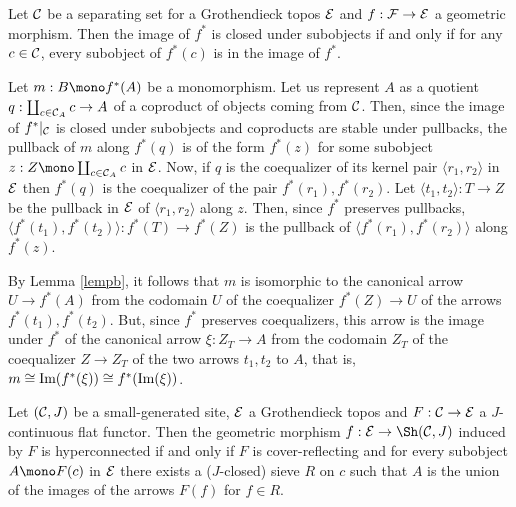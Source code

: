 \documentclass[a4paper,12pt]{article}
\begin{document}
\begin{proposition}\label{prophypersubobjects}
	Let ${\cal C}$ be a separating set for a Grothendieck topos $\cal E$ and $f:{\cal F}\to {\cal E}$ a geometric morphism. Then the image of $f^{\ast}$ is closed under subobjects if and only if for any $c\in {\cal C}$, every subobject of $f^{\ast}(c)$ is in the image of $f^{\ast}$.
\end{proposition}

\begin{proofs}
	Let $m:B\mono f^{\ast}(A)$ be a monomorphism. Let us represent $A$ as a quotient $q:\coprod_{c\in {\cal C}_{A}}c\to A$ of a coproduct of objects coming from $\cal C$. Then, since the image of $f^{\ast}|_{\cal C}$ is closed under subobjects and coproducts are stable under pullbacks, the pullback of $m$ along $f^{\ast}(q)$ is of the form $f^{\ast}(z)$ for some subobject $z:Z\mono \coprod_{c\in {\cal C}_{A}}c$ in $\cal E$. Now, if $q$ is the coequalizer of its kernel pair $\langle r_{1},r_{2} \rangle  $ in $\cal E$ then $f^{\ast}(q)$ is the coequalizer of the pair $f^{\ast}(r_{1}), f^{\ast}(r_{2})$. Let $\langle t_{1}, t_{2}\rangle:T\to Z$ be the pullback in $\cal E$ of $\langle r_{1}, r_{2}\rangle  $ along $z$. Then, since $f^{\ast}$ preserves pullbacks, $\langle f^{\ast}(t_{1}), f^{\ast}(t_{2})\rangle:f^{\ast}(T)\to f^{\ast}(Z)$ is the pullback of $\langle f^{\ast}(r_{1}), f^{\ast}(r_{2})\rangle  $ along $f^{\ast}(z)$.  
	
	 By Lemma \ref{lempb}, it follows that $m$ is isomorphic to the canonical arrow $U \to f^{\ast}(A)$ from the codomain $U$ of the coequalizer $f^{\ast}(Z)\to U$ of the arrows $f^{\ast}(t_{1}), f^{\ast}(t_{2})$. But, since $f^{\ast}$ preserves coequalizers, this arrow is the image under $f^{\ast}$ of the canonical arrow $\xi:Z_{T} \to A$ from the codomain $Z_{T}$ of the coequalizer $Z\to Z_{T}$ of the two arrows $t_{1}, t_{2}$ to $A$, that is, $m\cong \textup{Im}(f^{\ast}(\xi))\cong f^{\ast}(\textup{Im}(\xi))$. 
\end{proofs}

\begin{proposition}\label{prophyperconnected}
	Let $({\cal C}, J)$ be a small-generated site, $\cal E$ a Grothendieck topos and $F:{\cal C}\to {\cal E}$ a $J$-continuous flat  functor. Then the geometric morphism $f:{\cal E}\to \Sh({\cal C}, J)$ induced by $F$ is hyperconnected if and only if $F$ is cover-reflecting and for every subobject $A\mono F(c)$ in $\cal E$ there exists a ($J$-closed) sieve $R$ on $c$ such that $A$ is the union of the images of the arrows $F(f)$ for $f\in R$. 
\end{proposition}
\end{document}

